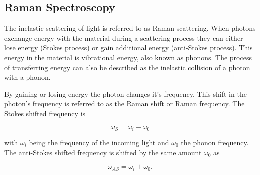 \subsection{Raman Spectroscopy}

The inelastic scattering of light is referred to as Raman scattering. When photons exchange energy with the material during a scattering process they can either lose energy (Stokes process) or gain additional energy (anti-Stokes process). This energy in the material is vibrational energy, also known as phonons. The process of transferring energy can also be described as
the inelastic collision of a photon with a phonon.

By gaining or losing energy the photon changes it's frequency. This shift in the photon's
frequency is referred to as the Raman shift or Raman frequency. The Stokes shifted frequency is

\begin{equation}
  \omega_S=\omega_i-\omega_0
\end{equation}


with $\omega_i$ being the frequency of the incoming light and $\omega_0$ the phonon frequency.
The anti-Stokes shifted frequency is shifted by the same amount $\omega_0$ as

\begin{equation}
  \omega_{AS}=\omega_i+\omega_0.
\end{equation}
